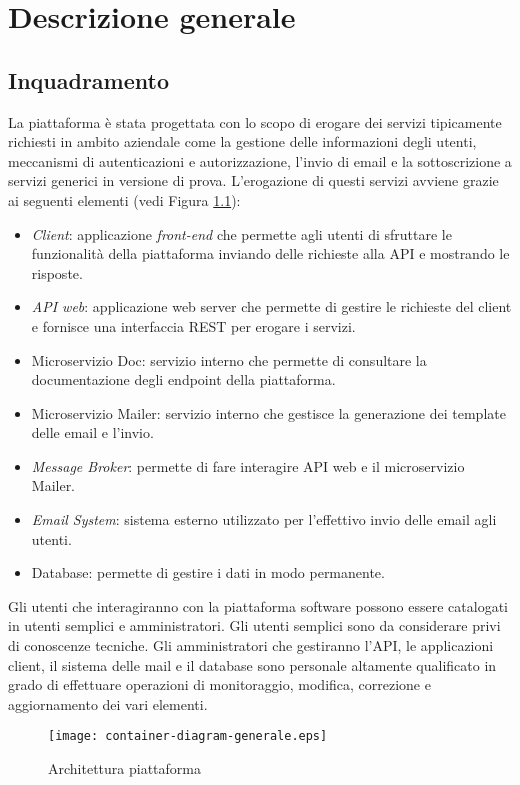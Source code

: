 \chapter{Descrizione generale}

\section{Inquadramento}
La piattaforma è stata progettata con lo scopo di erogare dei servizi tipicamente richiesti in ambito aziendale come la gestione delle
informazioni degli utenti, meccanismi di autenticazioni e autorizzazione, l'invio di
email e la sottoscrizione a servizi generici in versione di prova.
L'erogazione di questi servizi avviene grazie ai seguenti elementi (vedi Figura \ref{fig:Piattaforma}):
\begin{itemize}
    \itemsep0em
    \item \textit{Client}: applicazione \textit{front-end} che permette agli utenti di sfruttare le funzionalità della piattaforma inviando delle richieste alla API e mostrando le risposte.
    \item \textit{API web}: applicazione web server che permette di gestire le richieste del client e fornisce una interfaccia REST per erogare i servizi.
    \item Microservizio Doc: servizio interno che permette di consultare la documentazione degli endpoint della piattaforma.
    \item Microservizio Mailer: servizio interno che gestisce la generazione dei template delle email e l'invio.
    \item \textit{Message Broker}: permette di fare interagire API web e il microservizio Mailer.
    \item \textit{Email System}: sistema esterno utilizzato per l'effettivo invio delle email agli utenti.
    \item Database: permette di gestire i dati in modo permanente.
\end{itemize}

Gli utenti che interagiranno con la piattaforma software possono essere catalogati in utenti semplici e amministratori.
Gli utenti semplici sono da considerare privi di conoscenze tecniche. Gli amministratori che gestiranno l’API, le applicazioni client, il sistema delle mail e il database
sono personale altamente qualificato in grado di effettuare operazioni di monitoraggio, modifica, correzione e aggiornamento dei vari elementi.

\begin{figure}[H]
    \centering
    \texttt{[image: container-diagram-generale.eps]}
    \caption{Architettura piattaforma}
    \label{fig:Piattaforma}
\end{figure}

